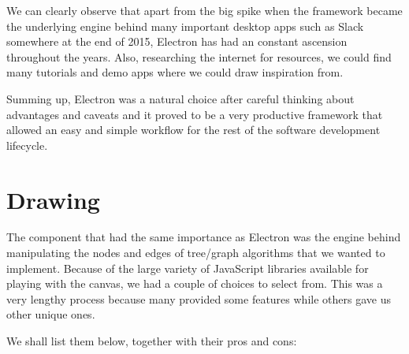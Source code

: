 \documentclass{l4proj}
\begin{document}
We can clearly observe that apart from the big spike when the framework became the underlying engine behind many important desktop apps such as Slack somewhere at the end of 2015, Electron has had an constant ascension throughout the years. Also, researching the internet for resources, we could find many tutorials and demo apps where we could draw inspiration from.

Summing up, Electron was a natural choice after careful thinking about advantages and caveats and it proved to be a very productive framework that allowed an easy and simple workflow for the rest of the software development lifecycle.

\section{Drawing}

The component that had the same importance as Electron was the engine behind manipulating the nodes and edges of tree/graph algorithms that we wanted to implement. Because of the large variety of JavaScript libraries available for playing with the canvas, we had a couple of choices to select from. This was a very lengthy process because many provided some features while others gave us other unique ones. 

We shall list them below, together with their pros and cons:
\end{document}
